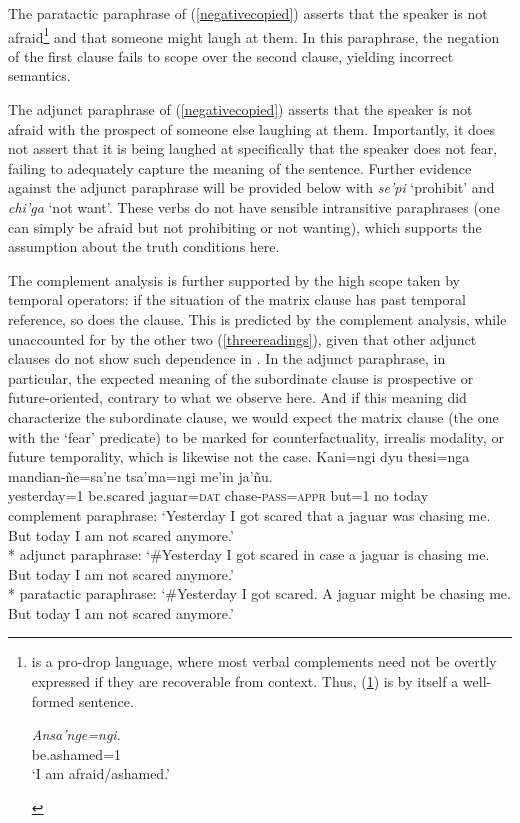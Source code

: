 \documentclass[output=paper,colorlinks,citecolor=brown]{langscibook}
\begin{document}
The paratactic paraphrase of (\ref{negativecopied}) asserts that the speaker is not afraid\footnote{ is a pro-drop language, where most verbal complements need not be overtly expressed if they are recoverable from context. Thus, (\ref{ex:i_am}) is by itself a well-formed sentence.
    \begin{exe}
        \ex \label{ex:i_am}
        \gll \textit{Ansa'nge=ngi.}  \\
        {be.ashamed=\textsc{1}} \\
        \glt `I am afraid/ashamed.'
    \end{exe}}
and that someone might laugh at them. In this paraphrase, the negation of the first clause fails to scope over the second clause, yielding incorrect semantics.

The adjunct paraphrase of (\ref{negativecopied}) asserts that the speaker is not afraid with the prospect of someone else laughing at them. Importantly, it does not assert that it is being laughed at specifically that the speaker does not fear, failing to adequately capture the meaning of the sentence. Further evidence against the adjunct paraphrase will be provided below with \textit{se'pi} `prohibit' and \textit{chi'ga} `not want'. These verbs do not have sensible intransitive paraphrases (one can simply be afraid but not prohibiting or not wanting), which supports the assumption about the truth conditions here.



\iffalse
    
The complement analysis is further supported by the high scope taken by temporal operators: if the situation of the matrix clause has past temporal reference, so does the  clause. This is predicted by the complement analysis, while unaccounted for by the other two (\ref{threereadings}), given that other adjunct clauses do not show such dependence in . In the adjunct paraphrase, in particular, the expected meaning of the subordinate  clause is prospective or future-oriented, contrary to what we observe here. And if this meaning did characterize the subordinate  clause, we would expect the matrix clause (\ie the one with the `fear' predicate) to be marked for counterfactuality, irrealis modality, or future temporality, which is likewise not the case.
    \ea \label{threereadings}
    \gll Kani=ngi dyu {\ob}thesi=nga {mandian-ñe=sa'ne{\cb}} tsa'ma=ngi me'in {ja'ñu.} \\
         yesterday\textsc{=}1 {be.scared} jaguar=\textsc{dat} chase-\textsc{pass=appr} but\textsc{=}1 no {today}  \\
    \glt complement paraphrase: `Yesterday I got scared that a jaguar was chasing me. But today I am not scared anymore.' \\*
         adjunct paraphrase: `\#Yesterday I got scared in case a jaguar is chasing me. But today I am not scared anymore.' \\*
         paratactic paraphrase: `\#Yesterday I got scared. A jaguar might be chasing me. But today I am not scared anymore.'
    \z 
    
\end{document}
